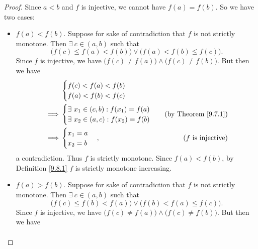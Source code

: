 \begin{proof}
    Since \(a < b\) and \(f\) is injective, we cannot have \(f(a) = f(b)\).
    So we have two cases:
    \begin{itemize}
        \item \(f(a) < f(b)\).
              Suppose for sake of contradiction that \(f\) is not strictly monotone.
              Then \(\exists\ c \in (a, b)\) such that
              \[
                  \big(f(c) \leq f(a) < f(b)\big) \lor \big(f(a) < f(b) \leq f(c)\big).
              \]
              Since \(f\) is injective, we have \(\big(f(c) \neq f(a)\big) \land \big(f(c) \neq f(b)\big)\).
              But then we have
              \begin{align*}
                           & \begin{cases}
                      f(c) < f(a) < f(b) \\
                      f(a) < f(b) < f(c)
                  \end{cases}                                    \\
                  \implies & \begin{cases}
                      \exists\ x_1 \in (c, b) : f(x_1) = f(a) \\
                      \exists\ x_2 \in (a, c) : f(x_2) = f(b) \\
                  \end{cases}  & \text{(by Theorem \ref{9.7.1})} \\
                  \implies & \begin{cases}
                      x_1 = a \\
                      x_2 = b
                  \end{cases}, & \text{(\(f\) is injective)}
              \end{align*}
              a contradiction.
              Thus \(f\) is strictly monotone.
              Since \(f(a) < f(b)\), by Definition \ref{9.8.1} \(f\) is strictly monotone increasing.
        \item \(f(a) > f(b)\).
              Suppose for sake of contradiction that \(f\) is not strictly monotone.
              Then \(\exists\ c \in (a, b)\) such that
              \[
                  \big(f(c) \leq f(b) < f(a)\big) \lor \big(f(b) < f(a) \leq f(c)\big).
              \]
              Since \(f\) is injective, we have \(\big(f(c) \neq f(a)\big) \land \big(f(c) \neq f(b)\big)\).
              But then we have
              \begin{align*}

\end{align*}
\end{itemize}
\end{proof}
